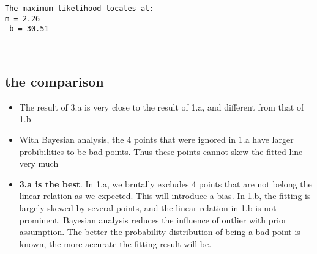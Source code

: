 \documentclass{article}
\newlength{\cellleftmargin}
\newlength{\smallerfontscale}
\def\smaller{\fontsize{\smallerfontscale}{\smallerfontscale}\selectfont}
\begin{document}
\par\vspace{1\smallerfontscale}%
    \begin{addmargin}[\cellleftmargin]{0em}%
    {\smaller%
    \vspace{-1\smallerfontscale}%
    
    \begin{Verbatim}[commandchars=\\\{\}]
The maximum likelihood locates at:
m = 2.26
 b = 30.51
    \end{Verbatim}
}%
    \end{addmargin}%
    \begin{addmargin}[\cellleftmargin]{0em}%
    {\smaller%
    \vspace{-1\smallerfontscale}%
    
    \begin{center}
    \end{center}
    { \hspace*{\fill} \\}
    }%
    \end{addmargin}%
    \subsection{the comparison}\label{the-comparison}

\begin{itemize}
\itemsep1pt\parskip0pt
\item
  The result of 3.a is very close to the result of 1.a, and different
  from that of 1.b
\item
  With Bayesian analysis, the 4 points that were ignored in 1.a have
  larger probibilities to be bad points. Thus these points cannot skew
  the fitted line very much
\item
  \textbf{3.a is the best}. In 1.a, we brutally excludes 4 points that
  are not belong the linear relation as we expected. This will introduce
  a bias. In 1.b, the fitting is largely skewed by several points, and
  the linear relation in 1.b is not prominent. Bayesian analysis reduces
  the influence of outlier with prior assumption. The better the
  probability distribution of being a bad point is known, the more
  accurate the fitting result will be.
\end{itemize}
\end{document}
